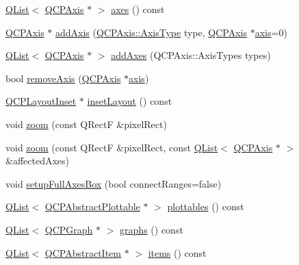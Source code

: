 \begin{DoxyCompactItemize}
\item 
\hyperlink{class_q_list}{Q\+List}$<$ \hyperlink{class_q_c_p_axis}{Q\+C\+P\+Axis} $\ast$ $>$ \hyperlink{class_q_c_p_axis_rect_a18dcdc0dd6c7520bc9f3d15a7a3feec2}{axes} () const 
\item 
\hyperlink{class_q_c_p_axis}{Q\+C\+P\+Axis} $\ast$ \hyperlink{class_q_c_p_axis_rect_a2dc336092ccc57d44a46194c8a23e4f4}{add\+Axis} (\hyperlink{class_q_c_p_axis_ae2bcc1728b382f10f064612b368bc18a}{Q\+C\+P\+Axis\+::\+Axis\+Type} type, \hyperlink{class_q_c_p_axis}{Q\+C\+P\+Axis} $\ast$\hyperlink{class_q_c_p_axis_rect_a560de44e47a4af0f86c59102a094b1e4}{axis}=0)
\item 
\hyperlink{class_q_list}{Q\+List}$<$ \hyperlink{class_q_c_p_axis}{Q\+C\+P\+Axis} $\ast$ $>$ \hyperlink{class_q_c_p_axis_rect_a792e1f3d9cb1591fca135bb0de9b81fc}{add\+Axes} (Q\+C\+P\+Axis\+::\+Axis\+Types types)
\item 
bool \hyperlink{class_q_c_p_axis_rect_a03c39cd9704f0d36fb6cf980cdddcbaa}{remove\+Axis} (\hyperlink{class_q_c_p_axis}{Q\+C\+P\+Axis} $\ast$\hyperlink{class_q_c_p_axis_rect_a560de44e47a4af0f86c59102a094b1e4}{axis})
\item 
\hyperlink{class_q_c_p_layout_inset}{Q\+C\+P\+Layout\+Inset} $\ast$ \hyperlink{class_q_c_p_axis_rect_a4114887c7141b59650b7488f930993e5}{inset\+Layout} () const 
\item 
void \hyperlink{class_q_c_p_axis_rect_a5fc8460564e81dcc2a9343dc8bc1fe67}{zoom} (const Q\+RectF \&pixel\+Rect)
\item 
void \hyperlink{class_q_c_p_axis_rect_ae481c28b50e10cfbbec59fde45e77367}{zoom} (const Q\+RectF \&pixel\+Rect, const \hyperlink{class_q_list}{Q\+List}$<$ \hyperlink{class_q_c_p_axis}{Q\+C\+P\+Axis} $\ast$ $>$ \&affected\+Axes)
\item 
void \hyperlink{class_q_c_p_axis_rect_a5fa906175447b14206954f77fc7f1ef4}{setup\+Full\+Axes\+Box} (bool connect\+Ranges=false)
\item 
\hyperlink{class_q_list}{Q\+List}$<$ \hyperlink{class_q_c_p_abstract_plottable}{Q\+C\+P\+Abstract\+Plottable} $\ast$ $>$ \hyperlink{class_q_c_p_axis_rect_a5b0d629c8de5572945eeae79a142296e}{plottables} () const 
\item 
\hyperlink{class_q_list}{Q\+List}$<$ \hyperlink{class_q_c_p_graph}{Q\+C\+P\+Graph} $\ast$ $>$ \hyperlink{class_q_c_p_axis_rect_afa4ff90901d9275f670e24b40e3c1b25}{graphs} () const 
\item 
\hyperlink{class_q_list}{Q\+List}$<$ \hyperlink{class_q_c_p_abstract_item}{Q\+C\+P\+Abstract\+Item} $\ast$ $>$ \hyperlink{class_q_c_p_axis_rect_a0f17ed539962cfcbaca8ce0b1776c840}{items} () const 

\end{DoxyCompactItemize}
